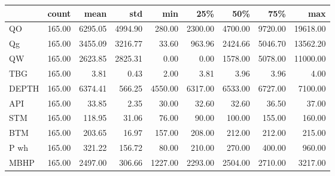 \begin{tabular}{lrrrrrrrr}
\toprule
{} &  count &    mean &     std &     min &     25\% &     50\% &     75\% &      max \\
\midrule
QO    & 165.00 & 6295.05 & 4994.90 &  280.00 & 2300.00 & 4700.00 & 9720.00 & 19618.00 \\
Qg    & 165.00 & 3455.09 & 3216.77 &   33.60 &  963.96 & 2424.66 & 5046.70 & 13562.20 \\
QW    & 165.00 & 2623.85 & 2825.31 &    0.00 &    0.00 & 1578.00 & 5078.00 & 11000.00 \\
TBG   & 165.00 &    3.81 &    0.43 &    2.00 &    3.81 &    3.96 &    3.96 &     4.00 \\
DEPTH & 165.00 & 6374.41 &  566.25 & 4550.00 & 6317.00 & 6533.00 & 6727.00 &  7100.00 \\
API   & 165.00 &   33.85 &    2.35 &   30.00 &   32.60 &   32.60 &   36.50 &    37.00 \\
STM   & 165.00 &  118.95 &   31.06 &   76.00 &   90.00 &  100.00 &  155.00 &   160.00 \\
BTM   & 165.00 &  203.65 &   16.97 &  157.00 &  208.00 &  212.00 &  212.00 &   215.00 \\
P wh  & 165.00 &  321.22 &  156.72 &   80.00 &  210.00 &  270.00 &  400.00 &   960.00 \\
MBHP  & 165.00 & 2497.00 &  306.66 & 1227.00 & 2293.00 & 2504.00 & 2710.00 &  3217.00 \\
\bottomrule
\end{tabular}

